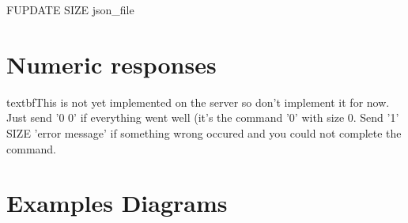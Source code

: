 \documentclass{article}
\begin{document}
\begin{center}FUPDATE SIZE json\_file\end{center}

\section{Numeric responses}

textbf{This is not yet implemented on the server so don't implement it for now.}
Just send '0 0' if everything went well (it's the command '0' with size 0. Send '1' SIZE 'error message' if something wrong occured and you could not complete the command.

\section{Examples Diagrams}


\end{document}

